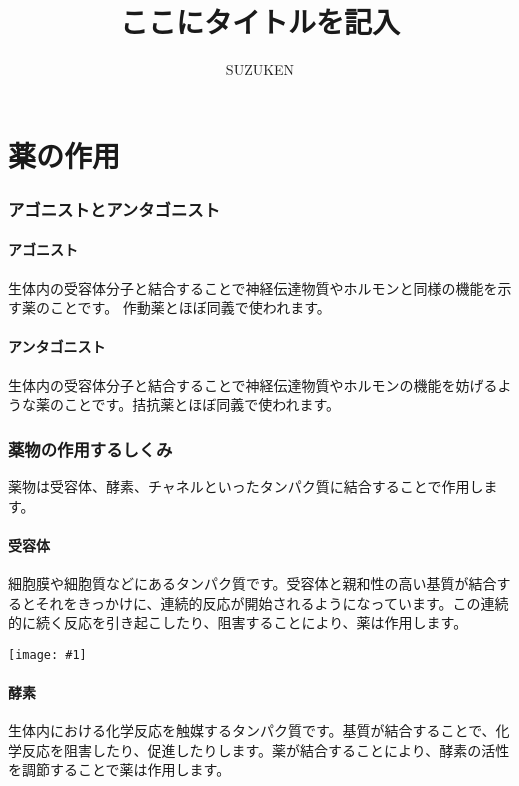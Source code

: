 \documentclass[a4paper,papersize,dvipdfmx]{jsarticle}
\newcommand{\pict}[2]{\begin{center} \texttt{[image: \#1]} \end{center}}   %
\begin{document}
\title{ここにタイトルを記入}
\author{SUZUKEN}
\date{}
\maketitle


\tableofcontents

\part{薬の作用}

\section{アゴニストとアンタゴニスト}


\subsection{アゴニスト}
生体内の受容体分子と結合することで神経伝達物質やホルモンと同様の機能を示す薬のことです。  作動薬とほぼ同義で使われます。


\subsection{アンタゴニスト}
生体内の受容体分子と結合することで神経伝達物質やホルモンの機能を妨げるような薬のことです。拮抗薬とほぼ同義で使われます。

\section{薬物の作用するしくみ}

薬物は受容体、酵素、チャネルといったタンパク質に結合することで作用します。

\subsection{受容体}
細胞膜や細胞質などにあるタンパク質です。受容体と親和性の高い基質が結合するとそれをきっかけに、連続的反応が開始されるようになっています。この連続的に続く反応を引き起こしたり、阻害することにより、薬は作用します。

\pict{imgs/sayo1.png}{10}

\subsection{酵素}
生体内における化学反応を触媒するタンパク質です。基質が結合することで、化学反応を阻害したり、促進したりします。薬が結合することにより、酵素の活性を調節することで薬は作用します。
\end{document}
